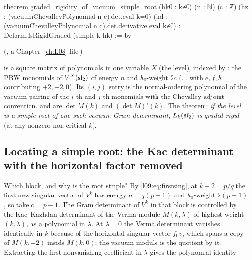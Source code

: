 \begin{leancode}
theorem graded_rigidity_of_vacuum_simple_root (hk0 : k≠0) (n : ℕ) (c : ℤ)
    (hz : (vacuumChevalleyPolynomial n c).det.eval k=0)
    (hd : (vacuumChevalleyPolynomial n c).det.derivative.eval k≠0) :
    Deform.IsRigidGraded (simple k hk) := by
\end{leancode}
(, a Chapter~\ref{ch:L08} file.)

\begin{dictionary}
 is a square matrix of polynomials in one variable $X$ (the level),
indexed by : the PBW monomials of $V^X(\mathfrak{sl}_2)$ of energy $n$ and
$h_0$-weight $2c$ (, , with $e,f,h$ contributing $+2,-2,0$). Its
$(i,j)$ entry is the normal-ordering polynomial of the vacuum pairing of the $i$-th and $j$-th
monomials with the Chevalley adjoint convention.  and 
are $\det M(k)$ and $(\det M)'(k)$. The theorem: \emph{if the level is a simple root of one such
vacuum Gram determinant, $L_k(\mathfrak{sl}_2)$ is graded rigid} (at any nonzero non-critical $k$).
\end{dictionary}

\subsection{Locating a simple root: the Kac determinant with the horizontal factor removed}

Which block, and why is the root simple? By \eqref{l09:eq:firstsing}, at $k+2 = p/q$ the first new
singular vector of $V^k$ has energy $n = q(p-1)$ and $h_0$-weight $2(p-1)$, so take $c = p-1$. The
Gram determinant of $V^k$ in that block is controlled by the Kac--Kazhdan determinant of the Verma
module $M(k,\lambda)$ of highest weight $(k,\lambda)$, as a polynomial in $\lambda$. At $\lambda = 0$ the Verma
determinant vanishes identically in $k$ because of the horizontal singular vector $f_0v$, which spans a
copy of $M(k,-2)$ inside $M(k,0)$; the vacuum module is the quotient by it. Extracting the first
nonvanishing coefficient in $\lambda$ gives the polynomial identity

